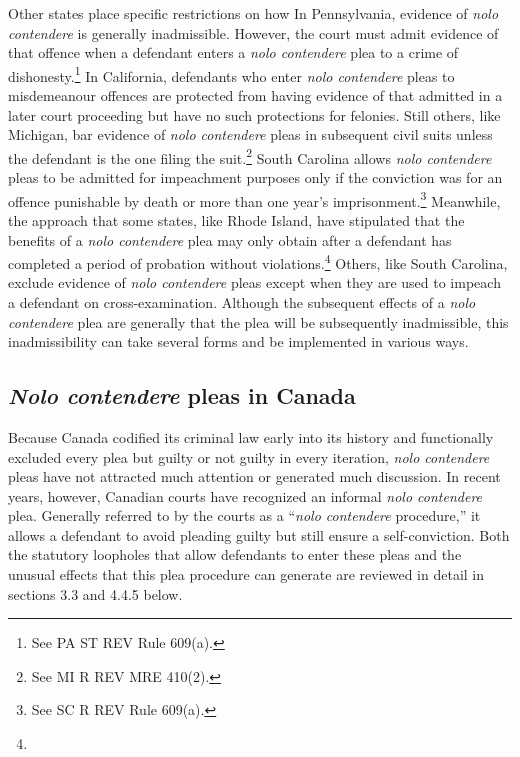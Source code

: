 Other states place specific restrictions on how In Pennsylvania, evidence of \textit{nolo contendere} is generally inadmissible. However, the court must admit evidence of that offence when a defendant enters a \textit{nolo contendere} plea to a crime of dishonesty.\footnote{See PA ST REV Rule 609(a).} In California, defendants who enter \textit{nolo contendere} pleas to misdemeanour offences are protected from having evidence of that admitted in a later court proceeding but have no such protections for felonies. Still others, like Michigan, bar evidence of \textit{nolo contendere} pleas in subsequent civil suits unless the defendant is the one filing the suit.\footnote{See MI R REV MRE 410(2).} South Carolina allows \textit{nolo contendere} pleas to be admitted for impeachment purposes only if the conviction was for an offence punishable by death or more than one year's imprisonment.\footnote{See SC R REV Rule 609(a).} Meanwhile, the approach that some states, like Rhode Island, have stipulated that the benefits of a \textit{nolo contendere} plea may only obtain after a defendant has completed a period of probation without violations.\footnote{} Others, like South Carolina, exclude evidence of \textit{nolo contendere} pleas except when they are used to impeach a defendant on cross-examination. Although the subsequent effects of a \textit{nolo contendere} plea are generally that the plea will be subsequently inadmissible, this inadmissibility can take several forms and be implemented in various ways.

\subsection{\textit{Nolo contendere} pleas in Canada}

Because Canada codified its criminal law early into its history and functionally excluded every plea but guilty or not guilty in every iteration, \textit{nolo contendere} pleas have not attracted much attention or generated much discussion. In recent years, however, Canadian courts have recognized an informal \textit{nolo contendere} plea. Generally referred to by the courts as a ``\textit{nolo contendere} procedure,'' it allows a defendant to avoid pleading guilty but still ensure a self-conviction. Both the statutory loopholes that allow defendants to enter these pleas and the unusual effects that this plea procedure can generate are reviewed in detail in sections 3.3 and 4.4.5 below.